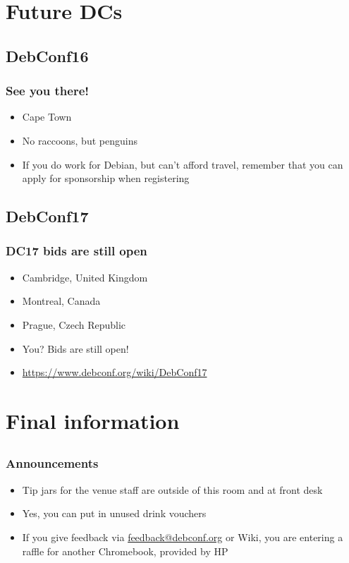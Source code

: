 \documentclass[t]{beamer}
\begin{document}
\section{Future DCs}

\subsection{DebConf16}

\begin{frame}
	\frametitle{See you there!}
	\begin{itemize}
		\item Cape Town
		\item No raccoons, but penguins
		\item If you do work for Debian, but can't afford travel, remember that you can apply for sponsorship when registering
\end{itemize}
\end{frame}

\subsection{DebConf17}

\begin{frame}
	\frametitle{DC17 bids are still open}
	\begin{itemize}
		\item Cambridge, United Kingdom
		\item Montreal, Canada
		\item Prague, Czech Republic
		\item You? Bids are still open!
		\item \url{https://www.debconf.org/wiki/DebConf17}
	\end{itemize}
\end{frame}


\section{Final information}

\subsection{}

\begin{frame}
	\frametitle{Announcements}
	\begin{itemize}
		\item Tip jars for the venue staff are outside of this room and at front desk
		\item Yes, you can put in unused drink vouchers
		\item If you give feedback via \url{feedback@debconf.org} or Wiki, you are entering a raffle for another Chromebook, provided by HP
	\end{itemize}
\end{frame}
\end{document}
